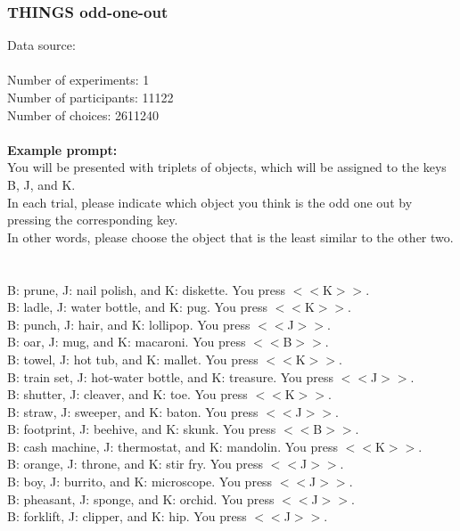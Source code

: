 \documentclass[pdflatex,sn-nature]{sn-jnl}%
\theoremstyle{thmstyleone}%
\theoremstyle{thmstyletwo}%
\theoremstyle{thmstylethree}%
\begin{document}
\subsubsection*{THINGS odd-one-out}
Data source: \cite{hebart2023things} \\ $~$ \\
Number of experiments: 1 $~$\\ 
Number of participants: 11122 $~$\\ 
Number of choices: 2611240 $~$\\ 
 $~$\\ 
\textbf{Example prompt:}
 $~$\\ 
You will be presented with triplets of objects, which will be assigned to the keys B, J, and K. $~$\\ 
In each trial, please indicate which object you think is the odd one out by pressing the corresponding key. $~$\\ 
In other words, please choose the object that is the least similar to the other two. $~$\\ 
 $~$\\ 
B: prune, J: nail polish, and K: diskette. You press $<<$K$>>$. $~$\\ 
B: ladle, J: water bottle, and K: pug. You press $<<$K$>>$. $~$\\ 
B: punch, J: hair, and K: lollipop. You press $<<$J$>>$. $~$\\ 
B: oar, J: mug, and K: macaroni. You press $<<$B$>>$. $~$\\ 
B: towel, J: hot tub, and K: mallet. You press $<<$K$>>$. $~$\\ 
B: train set, J: hot-water bottle, and K: treasure. You press $<<$J$>>$. $~$\\ 
B: shutter, J: cleaver, and K: toe. You press $<<$K$>>$. $~$\\ 
B: straw, J: sweeper, and K: baton. You press $<<$J$>>$. $~$\\ 
B: footprint, J: beehive, and K: skunk. You press $<<$B$>>$. $~$\\ 
B: cash machine, J: thermostat, and K: mandolin. You press $<<$K$>>$. $~$\\ 
B: orange, J: throne, and K: stir fry. You press $<<$J$>>$. $~$\\ 
B: boy, J: burrito, and K: microscope. You press $<<$J$>>$. $~$\\ 
B: pheasant, J: sponge, and K: orchid. You press $<<$J$>>$. $~$\\ 
B: forklift, J: clipper, and K: hip. You press $<<$J$>>$. $~$\\ 
\end{document}
